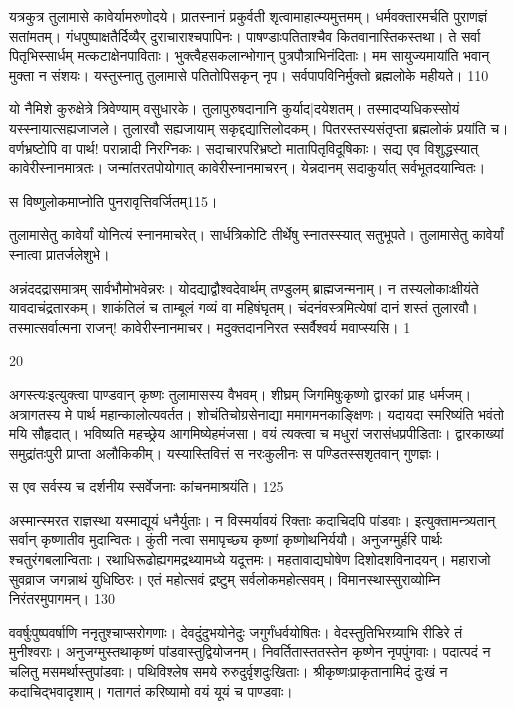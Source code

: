   यत्रकुत्र तुलामासे कावेर्यामरुणोदये।
 प्रातस्नानं प्रकुर्वती शृत्वामाहात्म्यमुत्तमम्।
 धर्मवक्तारमर्चति पुराणज्ञं सतांमतम्।
 गंधपुष्पाक्षतैर्दिव्यैर् दुराचाराश्चपापिनः।
 पाषण्डाःपतिताश्चैव कितवानास्तिकस्तथा।
 ते सर्वा पितृभिस्सार्धम् मत्कटाक्षेनपाविताः।
 भुक्त्वैहसकलान्भोगान् पुत्रपौत्राभिनंदिताः।
 मम सायुज्यमायांति भवान् मुक्ता न संशयः।
 यस्तुस्नातु तुलामासे पतितोपिसकृन् नृप।
 सर्वपापविनिर्मुक्तो ब्रह्मलोके महीयते।
 110

  यो नैमिशे कुरुक्षेत्रे त्रिवेण्याम् वसुधारके।
 तुलापुरुषदानानि कुर्याद|दयेशतम्।
 तस्मादप्यधिकस्सोयं यस्स्नायात्सह्यजाजले।
 तुलारवौ सह्यजायाम् सकृद्दद्यात्तिलोदकम्।
 पितरस्तस्यसंतृप्ता ब्रह्मलोकं प्रयांति च।
 वर्णभ्रष्टोपि वा पार्थ! परान्नादी निरग्निकः।
 सदाचारपरिभ्रष्टो मातापितृविदूषिकाः।
 सद्य एव विशुद्धस्यात् कावेरीस्नानमात्रतः।
 जन्मांतरतपोयोगात् कावेरीस्नानमाचरन्।
 येन्नदानम् सदाकुर्यात् सर्वभूतदयान्वितः।
 
स विष्णुलोकमाप्नोति पुनरावृत्तिवर्जितम्115।


 तुलामासेतु कावेर्यां योनित्यं स्नानमाचरेत्।
 सार्धत्रिकोटि तीर्थेषु स्नातस्स्यात् सतुभूपते।
 तुलामासेतु कावेर्यां स्नात्वा प्रातर्जलेशुभे।
 
अन्नंददद्रासमात्रम् सार्वभौमोभवेन्नरः।
 योदद्याद्वौश्वदेवार्थम् तण्डुलम् ब्राह्मजन्मनाम्।
 न तस्यलोकाःक्षीयंते यावदाचंद्रतारकम्।
 शाकंतिलं च ताम्बूलं गव्यं वा महिषंघृतम्।
 चंदनंवस्त्रमित्येषां दानं शस्तं तुलारवौ।
 तस्मात्सर्वात्मना राजन्! कावेरीस्नानमाचर।
 मदुक्तदाननिरत स्सर्वैश्वर्य मवाप्स्यसि।
 1

  20

  अगस्त्यःइत्युक्त्वा पाण्डवान् कृष्णः तुलामासस्य वैभवम्।
 शीघ्रम् जिगमिषुःकृष्णो द्वारकां प्राह धर्मजम्।
 अत्रागतस्य मे पार्थ महान्कालोत्यवर्तत।
 शोचंतिचोग्रसेनाद्या ममागमनकाङ्क्षिणः।
 यदायदा स्मरिष्यंति भवंतो मयि सौहृदात्।
 भविष्यति महच्छ्रेय आगमिष्येहमंजसा।
 वयं त्यक्त्वा च मधुरां जरासंधप्रपीडिताः।
 द्वारकाख्यां समुद्रांतःपुरी प्राप्ता अलौकिकीम्।
 यस्यास्तिवित्तं स नरःकुलीनः
स पण्डितस्सशृतवान् गुणज्ञः।

स एव सर्वस्य च दर्शनीय
स्सर्वेजनाः कांचनमाश्रयंति।
 125

  अस्मान्स्मरत राज्ञस्था यस्माद्यूयं धनैर्युताः।
 न विस्मर्यावयं रिक्ताः कदाचिदपि पांडवाः।
 इत्युक्तामन्त्र्यतान् सर्वान् कृष्णातीव मुदान्वितः।
 कुंती नत्वा समापृच्छ्य कृष्णां कृष्णोथनिर्ययौ।
 अनुजग्मुर्हरि पार्थः श्चतुरंगबलान्विताः।
 रथाधिरूढोह्यगमद्रथ्यामध्ये यदूत्तमः।
 महतावाद्यघोषेण दिशोदशविनादयन्।
 महाराजो सुवव्राज जगन्नाथं युधिष्ठिरः।
 एतं महोत्सवं द्रष्टुम् सर्वलोकमहोत्सवम्।
 विमानस्थास्सुराव्योम्नि निरंतरमुपागमन्।
 130

  ववर्षुःपुष्पवर्षाणि ननृतुश्चाप्सरोगणाः।
 देवदुंदुभयोनेदुः जगुर्गंधर्वयोषितः।
 वेदस्तुतिभिरग्र्याभि रीडिरे तं मुनीश्वराः।
 अनुजग्मुस्तथाकृष्णं पांडवास्तुद्वियोजनम्।
 निवर्तितास्ततस्तेन कृष्णेन नृपपुंगवाः।
 पदात्पदं न चलितु मसमर्थास्तुपांडवाः।
 पथिविश्लेष समये रुरुदुर्वृशदुःखिताः।
 श्रीकृष्णःप्राकृतानामिदं दुःखं न कदाचिद्भवादृशाम्।
 गतागतं करिष्यामो वयं यूयं च पाण्डवाः।
 
